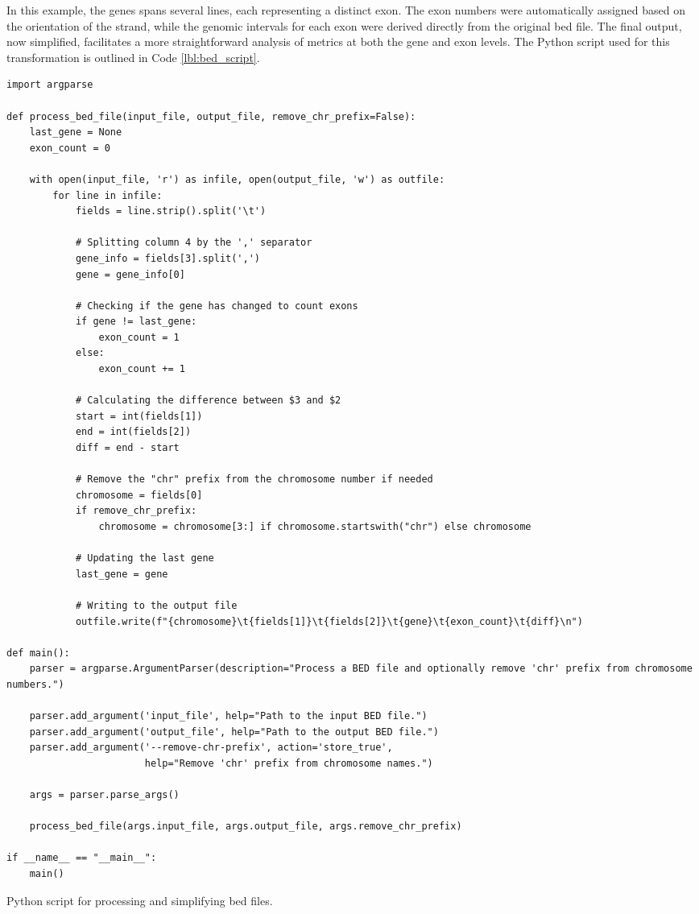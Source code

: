 In this example, the genes spans several lines, each representing a distinct exon. The exon numbers were automatically assigned based on the orientation of the strand, while the genomic intervals for each exon were derived directly from the original \ac{bed} file. The final output, now simplified, facilitates a more straightforward analysis of metrics at both the gene and exon levels. The Python script used for this transformation is outlined in Code \ref{lbl:bed_script}.

\begin{longlisting}
\begin{verbatim}
import argparse

def process_bed_file(input_file, output_file, remove_chr_prefix=False):
    last_gene = None
    exon_count = 0
    
    with open(input_file, 'r') as infile, open(output_file, 'w') as outfile:
        for line in infile:
            fields = line.strip().split('\t')
            
            # Splitting column 4 by the ',' separator
            gene_info = fields[3].split(',')
            gene = gene_info[0]
            
            # Checking if the gene has changed to count exons
            if gene != last_gene:
                exon_count = 1
            else:
                exon_count += 1
            
            # Calculating the difference between $3 and $2
            start = int(fields[1])
            end = int(fields[2])
            diff = end - start
            
            # Remove the "chr" prefix from the chromosome number if needed
            chromosome = fields[0]
            if remove_chr_prefix:
                chromosome = chromosome[3:] if chromosome.startswith("chr") else chromosome
            
            # Updating the last gene
            last_gene = gene
            
            # Writing to the output file
            outfile.write(f"{chromosome}\t{fields[1]}\t{fields[2]}\t{gene}\t{exon_count}\t{diff}\n")

def main():
    parser = argparse.ArgumentParser(description="Process a BED file and optionally remove 'chr' prefix from chromosome numbers.")
    
    parser.add_argument('input_file', help="Path to the input BED file.")
    parser.add_argument('output_file', help="Path to the output BED file.")
    parser.add_argument('--remove-chr-prefix', action='store_true', 
                        help="Remove 'chr' prefix from chromosome names.")

    args = parser.parse_args()
    
    process_bed_file(args.input_file, args.output_file, args.remove_chr_prefix)

if __name__ == "__main__":
    main()
\end{verbatim}
\caption{Python script for processing and simplifying \ac{bed} files.}
\label{lbl:bed_script}
\end{longlisting}

